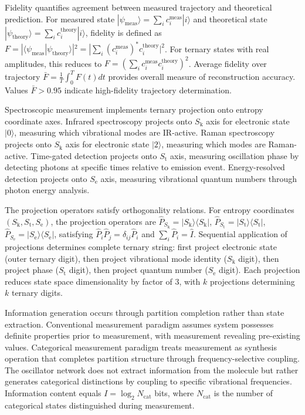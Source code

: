 \documentclass[twocolumn,10pt]{article}
\newcommand{\Sk}{S_{\text{k}}}
\newcommand{\St}{S_{\text{t}}}
\newcommand{\Se}{S_{\text{e}}}
\begin{document}
Fidelity quantifies agreement between measured trajectory and theoretical prediction. For measured state $|\psi_{\text{meas}}\rangle = \sum_i c_i^{\text{meas}} |i\rangle$ and theoretical state $|\psi_{\text{theory}}\rangle = \sum_i c_i^{\text{theory}} |i\rangle$, fidelity is defined as $F = |\langle \psi_{\text{meas}} | \psi_{\text{theory}} \rangle|^2 = |\sum_i (c_i^{\text{meas}})^* c_i^{\text{theory}}|^2$. For ternary states with real amplitudes, this reduces to $F = (\sum_i c_i^{\text{meas}} c_i^{\text{theory}})^2$. Average fidelity over trajectory $\bar{F} = \frac{1}{T} \int_0^T F(t) dt$ provides overall measure of reconstruction accuracy. Values $\bar{F} > 0.95$ indicate high-fidelity trajectory determination.

Spectroscopic measurement implements ternary projection onto entropy coordinate axes. Infrared spectroscopy projects onto $\Sk$ axis for electronic state $|0\rangle$, measuring which vibrational modes are IR-active. Raman spectroscopy projects onto $\Sk$ axis for electronic state $|2\rangle$, measuring which modes are Raman-active. Time-gated detection projects onto $\St$ axis, measuring oscillation phase by detecting photons at specific times relative to emission event. Energy-resolved detection projects onto $\Se$ axis, measuring vibrational quantum numbers through photon energy analysis.

The projection operators satisfy orthogonality relations. For entropy coordinates $(\Sk, \St, \Se)$, the projection operators are $\hat{P}_{\Sk} = |\Sk\rangle\langle\Sk|$, $\hat{P}_{\St} = |\St\rangle\langle\St|$, $\hat{P}_{\Se} = |\Se\rangle\langle\Se|$, satisfying $\hat{P}_i \hat{P}_j = \delta_{ij} \hat{P}_i$ and $\sum_i \hat{P}_i = \hat{I}$. Sequential application of projections determines complete ternary string: first project electronic state (outer ternary digit), then project vibrational mode identity ($\Sk$ digit), then project phase ($\St$ digit), then project quantum number ($\Se$ digit). Each projection reduces state space dimensionality by factor of 3, with $k$ projections determining $k$ ternary digits.

Information generation occurs through partition completion rather than state extraction. Conventional measurement paradigm assumes system possesses definite properties prior to measurement, with measurement revealing pre-existing values. Categorical measurement paradigm treats measurement as synthesis operation that completes partition structure through frequency-selective coupling. The oscillator network does not extract information from the molecule but rather generates categorical distinctions by coupling to specific vibrational frequencies. Information content equals $I = \log_2 N_{\text{cat}}$ bits, where $N_{\text{cat}}$ is the number of categorical states distinguished during measurement.
\end{document}
